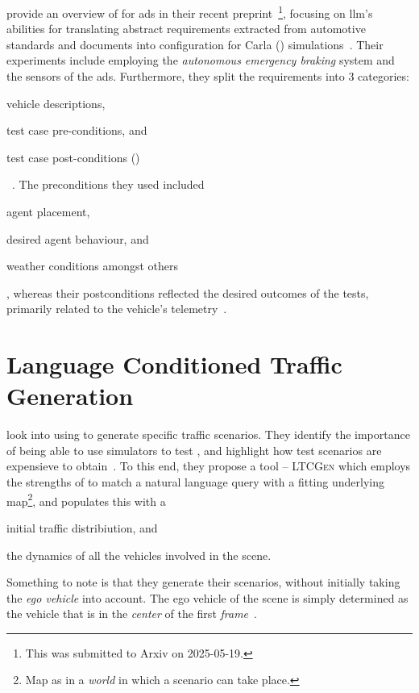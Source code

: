 \citeauthor{requirementsAllYouNeed} provide an overview of  for \acrshort{ads} in
their recent preprint~\footnote{This was submitted to Arxiv on
  2025-05-19.}, focusing on \acrshort{llm}'s abilities for translating abstract requirements extracted
from automotive standards and documents into configuration for Carla ()
simulations~\cite{requirementsAllYouNeed}. Their experiments include employing the
\textit{autonomous emergency braking} system and the sensors of the \acrshort{ads}. Furthermore, they
split the requirements into \num{3} categories: \begin{inparaenum}
  \item vehicle descriptions,
  \item test case pre-conditions, and
  \item test case post-conditions ()
\end{inparaenum}~\cite{requirementsAllYouNeed}. The preconditions they used included
\begin{inparaenum}
  \item agent placement,
  \item desired agent behaviour, and
  \item weather conditions amongst others\end{inparaenum}, whereas their postconditions reflected
the desired outcomes of the tests, primarily related to the vehicle's
telemetry~\cite{requirementsAllYouNeed}.

\section{Language Conditioned Traffic Generation}

\citeauthor{languageconditionedtrafficgeneration} look into using  to generate
specific traffic scenarios. They identify the importance of being able to use simulators to test
, and highlight how test scenarios are expensieve to
obtain~\cite[1]{languageconditionedtrafficgeneration}. To this end, they propose a tool --
\textsc{LTCGen} which employs the strengths of  to match a natural language query
with a fitting underlying map\footnote{Map as in a \textit{world} in which a scenario can take
  place.}, and populates this with a \begin{inparaenum}
  \item initial traffic distribiution, and
  \item the dynamics of all the vehicles involved in the scene.
\end{inparaenum}
Something to note is that they generate their scenarios, without initially taking the \textit{ego
  vehicle} into account. The ego vehicle of the scene is simply determined as the vehicle that is
in the \textit{center} of the first
\textit{frame}~\cite[3]{languageconditionedtrafficgeneration}.

